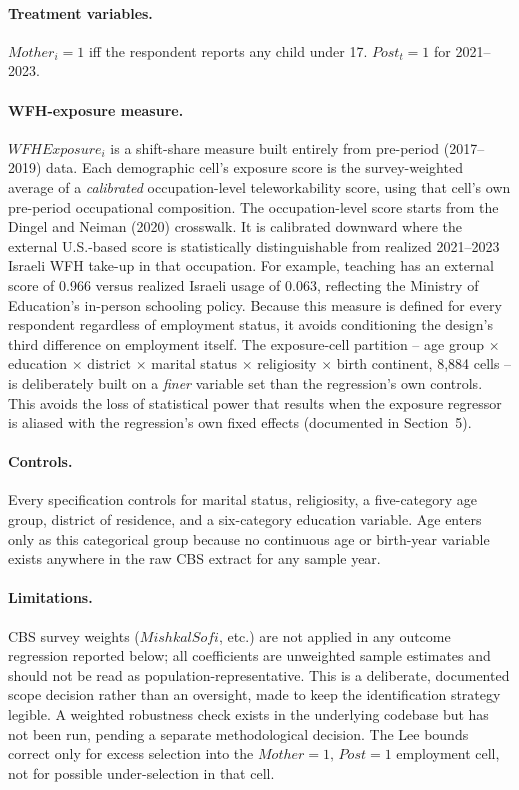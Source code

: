 \documentclass[11pt]{article}
\begin{document}
\paragraph{Treatment variables.} $Mother_i=1$ iff the respondent reports any child under 17. $Post_t=1$ for 2021--2023.

\paragraph{WFH-exposure measure.} $WFHExposure_i$ is a shift-share measure built entirely from pre-period (2017--2019) data. Each demographic cell's exposure score is the survey-weighted average of a \emph{calibrated} occupation-level teleworkability score, using that cell's own pre-period occupational composition. The occupation-level score starts from the Dingel and Neiman (2020) crosswalk. It is calibrated downward where the external U.S.-based score is statistically distinguishable from realized 2021--2023 Israeli WFH take-up in that occupation. For example, teaching has an external score of 0.966 versus realized Israeli usage of 0.063, reflecting the Ministry of Education's in-person schooling policy. Because this measure is defined for every respondent regardless of employment status, it avoids conditioning the design's third difference on employment itself. The exposure-cell partition -- age group $\times$ education $\times$ district $\times$ marital status $\times$ religiosity $\times$ birth continent, 8{,}884 cells -- is deliberately built on a \emph{finer} variable set than the regression's own controls. This avoids the loss of statistical power that results when the exposure regressor is aliased with the regression's own fixed effects (documented in Section~5).

\paragraph{Controls.} Every specification controls for marital status, religiosity, a five-category age group, district of residence, and a six-category education variable. Age enters only as this categorical group because no continuous age or birth-year variable exists anywhere in the raw CBS extract for any sample year.

\paragraph{Limitations.} CBS survey weights ($MishkalSofi$, etc.) are not applied in any outcome regression reported below; all coefficients are unweighted sample estimates and should not be read as population-representative. This is a deliberate, documented scope decision rather than an oversight, made to keep the identification strategy legible. A weighted robustness check exists in the underlying codebase but has not been run, pending a separate methodological decision. The Lee bounds correct only for excess selection into the $Mother=1,\,Post=1$ employment cell, not for possible under-selection in that cell.
\end{document}

